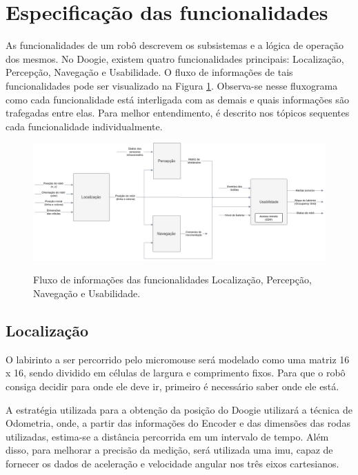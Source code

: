 \section{Especificação das funcionalidades}
\label{sec:especificacao_das_funcionalidades}
As funcionalidades de um robô descrevem os subsistemas e a lógica de operação dos mesmos. No Doogie, existem quatro funcionalidades principais: Localização, Percepção, Navegação e Usabilidade. O fluxo de informações de tais funcionalidades pode ser visualizado na Figura \ref{fig:especificacao_funcional_geral}. Observa-se nesse fluxograma como cada funcionalidade está interligada com as demais e quais informações são trafegadas entre elas. Para melhor entendimento, é descrito nos tópicos sequentes cada funcionalidade individualmente.

\begin{figure}[H]
	\centering
	\captionsetup{justification=centering}
	\caption{Fluxo de informações das funcionalidades Localização, Percepção, Navegação e Usabilidade.}
	\includegraphics[width=1\textwidth]
	{Figures/especificacao_funcional_geral}
	\label{fig:especificacao_funcional_geral}
\end{figure}

\subsection{Localização}
\label{ssec:funcionalidade_localizacao}
O labirinto a ser percorrido pelo micromouse será modelado como uma matriz 16 x 16, sendo dividido em células de largura e comprimento fixos. Para que o robô consiga decidir para onde ele deve ir, primeiro é necessário saber onde ele está.

A estratégia utilizada para a obtenção da posição do Doogie utilizará a técnica de Odometria, onde, a partir das informações do Encoder e das dimensões das rodas utilizadas, estima-se a distância percorrida em um intervalo de tempo. Além disso, para melhorar a precisão da medição, será utilizada uma \gls*{imu}, capaz de fornecer os dados de aceleração e velocidade angular nos três eixos cartesianos.


